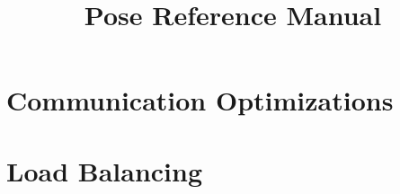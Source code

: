 \documentclass[10pt]{article}
\newcommand{\pose}{{\sc Pose}}
\begin{document}
\title{\pose{} Reference Manual}

\maketitle






\section{Communication Optimizations}
\section{Load Balancing}

\end{document}
